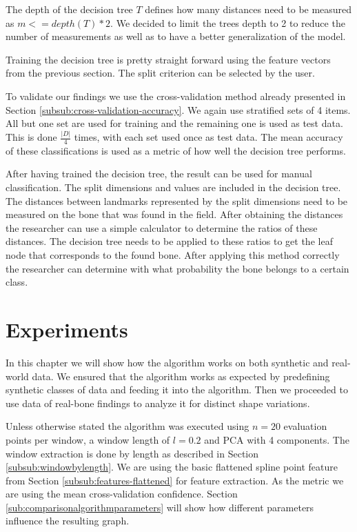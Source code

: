 \documentclass[pdftex,12pt,a4paper]{report}
\begin{document}
The depth of the decision tree $T$ defines how many distances need to be measured as $m <= depth(T) * 2$. We decided to limit the trees depth to 2 to reduce the number of measurements as well as to have a better generalization of the model.

Training the decision tree is pretty straight forward using the feature vectors from the previous section. The split criterion can be selected by the user.

To validate our findings we use the cross-validation method already presented in Section \ref{subsub:cross-validation-accuracy}. We again use stratified sets of 4 items. All but one set are used for training and the remaining one is used as test data. This is done $\frac{|D|}{4}$ times, with each set used once as test data. The mean accuracy of these classifications is used as a metric of how well the decision tree performs.

After having trained the decision tree, the result can be used for manual classification. The split dimensions and values are included in the decision tree. The distances between landmarks represented by the split dimensions need to be measured on the bone that was found in the field. After obtaining the distances the researcher can use a simple calculator to determine the ratios of these distances. The decision tree needs to be applied to these ratios to get the leaf node that corresponds to the found bone. After applying this method correctly the researcher can determine with what probability the bone belongs to a certain class.

\chapter{Experiments}

In this chapter we will show how the algorithm works on both synthetic and real-world data. We ensured that the algorithm works as expected by predefining synthetic classes of data and feeding it into the algorithm. Then we proceeded to use data of real-bone findings to analyze it for distinct shape variations. 

Unless otherwise stated the algorithm was executed using $n=20$ evaluation points per window, a window length of $l=0.2$ and PCA with 4 components. The window extraction is done by length as described in Section \ref{subsub:windowbylength}. We are using the basic flattened spline point feature from Section \ref{subsub:features-flattened} for feature extraction. As the metric we are using the mean cross-validation confidence. Section \ref{sub:comparisonalgorithmparameters} will show how different parameters influence the resulting graph.
\end{document}
